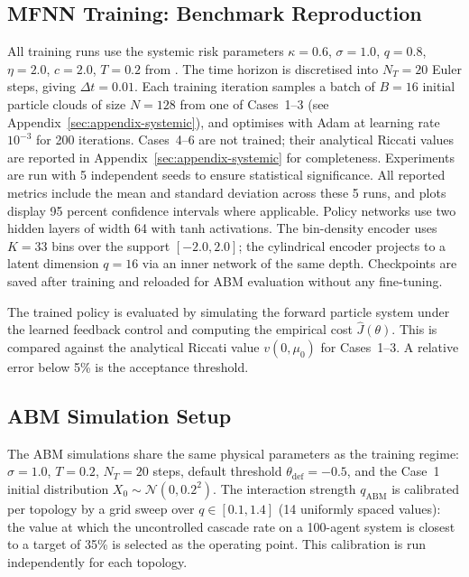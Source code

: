 \documentclass[11pt]{article}
\begin{document}
\subsection{MFNN Training: Benchmark Reproduction}

All training runs use the systemic risk parameters $\kappa = 0.6$, $\sigma = 1.0$, $q = 0.8$, $\eta = 2.0$, $c = 2.0$, $T = 0.2$ from \citet{pham2024mfnn}. The time horizon is discretised into $N_T = 20$ Euler steps, giving $\Delta t = 0.01$. Each training iteration samples a batch of $B = 16$ initial particle clouds of size $N = 128$ from one of Cases~1--3 (see Appendix~\ref{sec:appendix-systemic}), and optimises with Adam at learning rate $10^{-3}$ for 200 iterations. Cases~4--6 are not trained; their analytical Riccati values are reported in Appendix~\ref{sec:appendix-systemic} for completeness. Experiments are run with 5 independent seeds to ensure statistical significance. All reported metrics include the mean and standard deviation across these 5 runs, and plots display 95 percent confidence intervals where applicable. Policy networks use two hidden layers of width 64 with tanh activations. The bin-density encoder uses $K = 33$ bins over the support $[-2.0, 2.0]$; the cylindrical encoder projects to a latent dimension $q = 16$ via an inner network of the same depth. Checkpoints are saved after training and reloaded for ABM evaluation without any fine-tuning.

The trained policy is evaluated by simulating the forward particle system under the learned feedback control and computing the empirical cost $\hat{J}(\theta)$. This is compared against the analytical Riccati value $v(0, \mu_0)$ for Cases~1--3. A relative error below 5\% is the acceptance threshold.

\subsection{ABM Simulation Setup}

The ABM simulations share the same physical parameters as the training regime: $\sigma = 1.0$, $T = 0.2$, $N_T = 20$ steps, default threshold $\theta_{\mathrm{def}} = -0.5$, and the Case~1 initial distribution $X_0 \sim \mathcal{N}(0, 0.2^2)$. The interaction strength $q_{\mathrm{ABM}}$ is calibrated per topology by a grid sweep over $q \in [0.1, 1.4]$ (14 uniformly spaced values): the value at which the uncontrolled cascade rate on a 100-agent system is closest to a target of 35\% is selected as the operating point. This calibration is run independently for each topology.
\end{document}
